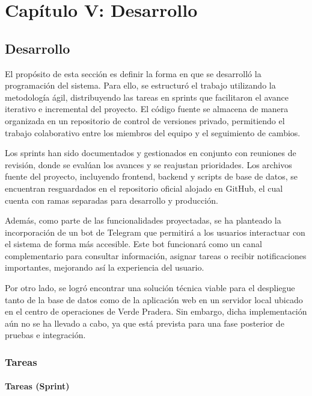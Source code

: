 \chapter{\textbf{Capítulo V: Desarrollo}}

\section{Desarrollo}

El propósito de esta sección es definir la forma en que se desarrolló la programación del sistema. Para ello, se estructuró el trabajo utilizando la metodología ágil, distribuyendo las tareas en sprints que facilitaron el avance iterativo e incremental del proyecto. El código fuente se almacena de manera organizada en un repositorio de control de versiones privado, permitiendo el trabajo colaborativo entre los miembros del equipo y el seguimiento de cambios.

Los sprints han sido documentados y gestionados en conjunto con reuniones de revisión, donde se evalúan los avances y se reajustan prioridades. Los archivos fuente del proyecto, incluyendo frontend, backend y scripts de base de datos, se encuentran resguardados en el repositorio oficial alojado en GitHub, el cual cuenta con ramas separadas para desarrollo y producción.

Además, como parte de las funcionalidades proyectadas, se ha planteado la incorporación de un bot de Telegram que permitirá a los usuarios interactuar con el sistema de forma más accesible. Este bot funcionará como un canal complementario para consultar información, asignar tareas o recibir notificaciones importantes, mejorando así la experiencia del usuario.

Por otro lado, se logró encontrar una solución técnica viable para el despliegue tanto de la base de datos como de la aplicación web en un servidor local ubicado en el centro de operaciones de Verde Pradera. Sin embargo, dicha implementación aún no se ha llevado a cabo, ya que está prevista para una fase posterior de pruebas e integración.

\subsection{Tareas}

\subsubsection{Tareas (Sprint)}

